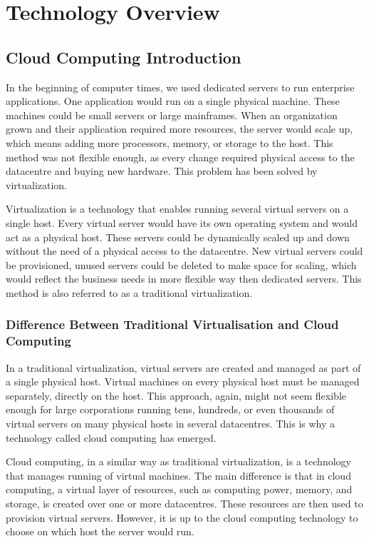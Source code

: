 
\chapter{Technology Overview}
\label{ch:overview}

\section{Cloud Computing Introduction}
In the beginning of computer times, we used dedicated servers to run enterprise applications. One application would run on a single physical machine. These machines could be small servers or large mainframes. When an organization grown and their application required more resources, the server would scale up, which means adding more processors, memory, or storage to the host. This method was not flexible enough, as every change required physical access to the datacentre and buying new hardware. This problem has been solved by virtualization.

Virtualization is a technology that enables running several virtual servers on a single host. Every virtual server would have its own operating system and would act as a physical host. These servers could be dynamically scaled up and down without the need of a physical access to the datacentre. New virtual servers could be provisioned, unused servers could be deleted to make space for scaling, which would reflect the business needs in more flexible way then dedicated servers. This method is also referred to as a traditional virtualization.

\subsection{Difference Between Traditional Virtualisation and Cloud Computing}
In a traditional virtualization, virtual servers are created and managed as part of a single physical host. Virtual machines on every physical host must be managed separately, directly on the host. This approach, again, might not seem flexible enough for large corporations running tens, hundreds, or even thousands of virtual servers on many physical hosts in several datacentres. This is why a technology called cloud computing has emerged.

Cloud computing, in a similar way as traditional virtualization, is a technology that manages running of virtual machines. The main difference is that in cloud computing, a virtual layer of resources, such as computing power, memory, and storage, is created over one or more datacentres. These resources are then used to provision virtual servers. However, it is up to the cloud computing technology to choose on which host the server would run.

